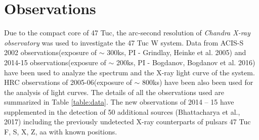\documentclass[a4paper,fleqn,usenatbib]{mnras}
\begin{document}
\section{Observations}

Due to the compact core of 47 Tuc, the arc-second resolution of \emph{Chandra X-ray observatory} was used to investigate the 47 Tuc W 
system. Data from ACIS-S 2002 observations(exposure of $\sim$ 300ks, PI - Grindlay, Heinke et al. 2005) and 2014-15 observations(exposure of $\sim$ 200ks, PI - Bogdanov, Bogdanov et al. 2016) have been used to 
analyze the spectrum and the X-ray light curve of the system. HRC observations of 2005-06(exposure of $\sim$ 800ks) have been also been used for the analysis of light curves.
The details of all the observations used are summarized in Table \ref{table:data}. The new observations of 2014 -- 15 have supplemented
in the detection of 50 additional sources (Bhattacharya et al., 2017) including the previously undetected X-ray
counterparts of pulsars 47 Tuc F, S, X, Z, aa with known positions.
\end{document}
